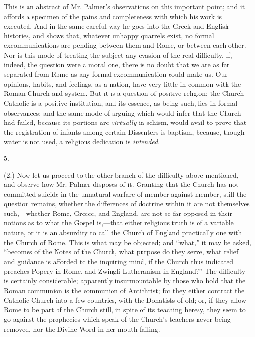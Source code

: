 This is an abstract of Mr. Palmer's observations
on this important point; and it affords a specimen of the pains and
completeness with which his work is executed. And in the same careful
way he goes into the Greek and English histories, and shows that,
whatever unhappy quarrels exist, no formal excommunications are
pending between them and Rome, or between each other. Nor is this mode
of treating the subject any evasion of the real difficulty. If,
indeed, the question were a moral one, there is no doubt that we are
as far separated from Rome as any formal excommunication could make
us. Our opinions, habits, and feelings, as a nation, have very little
in common with the Roman Church and system. But it is a question of
positive religion; the Church Catholic is a positive institution, and
its essence, as being such, lies in formal observances; and the same
mode of arguing which would infer that the Church had failed, because
its portions are \emph{virtually} in schism, would avail to prove that the
registration of infants among certain Dissenters is baptism, because,
though water is not used, a religious dedication is \emph{intended}.

5.

(2.) Now let us proceed to the other branch of
the difficulty above mentioned, and observe how Mr. Palmer disposes of
it. Granting that the Church has not committed suicide in the
unnatural warfare of member against member, still the question
remains, whether the differences of doctrine within it are not
themselves such,—whether Rome, Greece, and England, are not so far
opposed in their notions as to what the Gospel is,—that either
religious truth is of a variable nature, or it is an absurdity to call
the Church of England practically one with the Church of Rome. This is
what may be objected; and ``what,'' it may be asked, ``becomes of the
Notes of the Church, what purpose do they serve, what relief and
guidance is afforded to the inquiring mind, if the Church thus
indicated preaches Popery in Rome, and Zwingli-Lutheranism in England?''
The difficulty is certainly considerable; apparently insurmountable by
those who hold that the Roman communion is the communion of
Antichrist; for they either contract the Catholic Church into a few
countries, with the Donatists of old; or, if they allow Rome to be
part of the Church still, in spite of its teaching heresy, they seem
to go against the prophecies which speak of the Church's teachers
never being removed, nor the Divine Word in her mouth failing.


